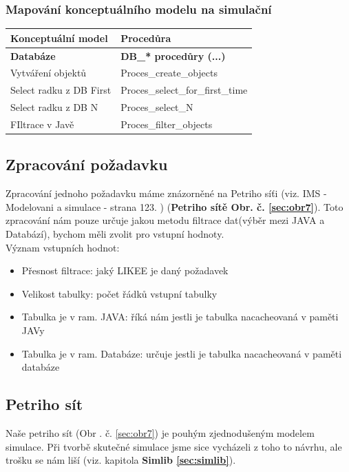 \documentclass[a4paper, 11pt]{article}
\begin{document}
\subsubsection{Mapování konceptuálního modelu na simulační}
\begin{center}
\begin{tabular}{ |l|l| }
  \hline
  \textbf{Konceptuální model} &  \textbf{Procedůra} \\ \hline      \textbf{Databáze} &  \textbf{DB\_* procedůry (...)} \\ \hline 
  Vytváření objektů & Proces\_create\_objects \\ \hline
  Select radku z DB First & Proces\_select\_for\_first\_time \\ \hline
  Select radku z DB N & Proces\_select\_N \\ \hline
  FIltrace v Javě & Proces\_filter\_objects\\ \hline
\end{tabular}
\end{center}

\subsection{Zpracování požadavku}
	Zpracování jednoho požadavku máme znázorněné na Petriho síťi (viz.
	IMS - Modelovani a simulace - strana 123. \cite{ims-prednasky}) (\textbf{Petriho sítě Obr. č. \ref{sec:obr7}}). Toto zpracování nám pouze určuje jakou metodu filtrace dat(výběr mezi JAVA a Databází), bychom měli zvolit pro vstupní hodnoty. 
\\
Význam vstupních hodnot:

\begin{itemize}
\item Přesnost filtrace: jaký LIKEE je daný požadavek
\item Velikost tabulky: počet řádků vstupní tabulky
\item Tabulka je v ram. JAVA: říká nám jestli je tabulka nacacheovaná v paměti JAVy
\item Tabulka je v ram. Databáze: určuje jestli je tabulka nacacheovaná v paměti databáze

\end{itemize}

\subsection{Petriho sít} \label{petrinetwork}
Naše petriho sít (Obr . č. \ref{sec:obr7}) je pouhým zjednodušeným modelem simulace. Při tvorbě skutečné simulace jsme sice vycházeli z toho to návrhu, ale trošku se nám liší (viz. kapitola \textbf{Simlib \ref{sec:simlib}}). 
\end{document}
